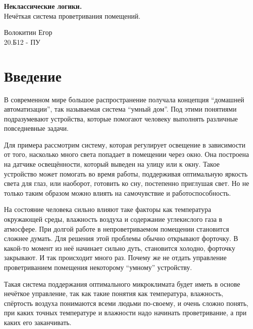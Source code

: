 \documentclass[a4paper]{article}
\begin{document}
\begin{titlepage}
    \begin{center}
        \vspace*{\fill}
        {\bfseries Неклассические логики.} \\
        Нечёткая система проветривания помещений.
    \end{center}
    \vspace{\fill}
    \begin{flushright}
        Волокитин Егор \\
        20.Б12 - ПУ
    \end{flushright}
\end{titlepage}

\newpage
\tableofcontents

\newpage
\section{Введение}
В современном мире большое распространение получала концепция 
“домашней автоматизации”, так называемая система “умный дом”. 
Под этими понятиями подразумевают устройства, которые помогают 
человеку выполнять различные повседневные задачи. 

Для примера рассмотрим систему, которая регулирует освещение 
в зависимости от того, насколько много света попадает в помещении 
через окно. Она построена на датчике освещённости, который выведен 
на улицу или к окну. Такое устройство может помогать во время 
работы, поддерживая оптимальную яркость света для глаз, или наоборот, 
готовить ко сну, постепенно приглушая свет. Но не только таким 
образом можно влиять на самочувствие и работоспособность.

На состояние человека сильно влияют таке факторы как температура 
окружающей среды, влажность воздуха и содержание 
углекислого газа в атмосфере. При долгой работе 
в непроветриваемом помещении становится сложнее думать. Для решения 
этой проблемы обычно открывают форточку. В какой-то момент из неё 
начинает сильно дуть, становится холодно, форточку закрывают. 
И так происходит много раз. Почему же не отдать управление проветриванием 
помещения некоторому “умному” устройству.

Такая система поддержания оптимального микроклимата будет иметь в 
основе нечёткое управление, так как такие понятия как температура, 
влажность, спёртость воздуха понимаются всеми людьми по-своему, и очень
сложно понять, при каких точных температуре и влажности надо начинать
проветривание, а при каких его заканчивать.
\end{document}
